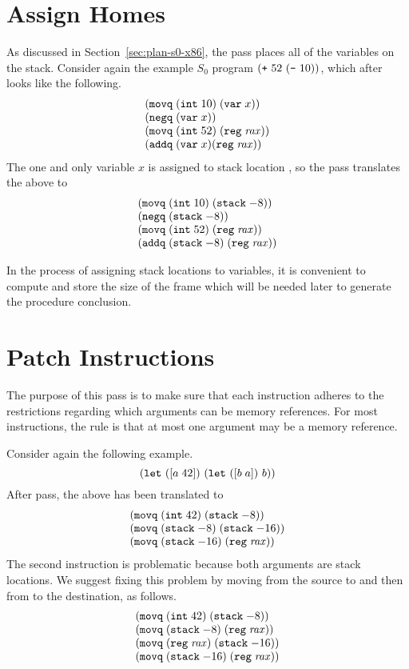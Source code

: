 \documentclass[12pt]{book}
\begin{document}
\section{Assign Homes}
\label{sec:assign-s0}

As discussed in Section~\ref{sec:plan-s0-x86}, the
 pass places all of the variables on the stack.
Consider again the example $S_0$ program $(\texttt{+}~52~ (\texttt{-}~10) )$,
which after  looks like the following.
\[
\begin{array}{l}
(\texttt{movq}\;(\texttt{int}\;10)\; (\texttt{var}\;x))\\
(\texttt{negq}\; (\texttt{var}\;x))\\
(\texttt{movq}\; (\texttt{int}\;52)\; (\texttt{reg}\;\mathit{rax}))\\
(\texttt{addq}\; (\texttt{var}\;x) (\texttt{reg}\;\mathit{rax}))
\end{array}
\]
The one and only variable $x$ is assigned to stack location
, so the  pass translates the
above to
\[
\begin{array}{l}
(\texttt{movq}\;(\texttt{int}\;10)\; (\texttt{stack}\;{-}8))\\
(\texttt{negq}\; (\texttt{stack}\;{-}8))\\
(\texttt{movq}\; (\texttt{int}\;52)\; (\texttt{reg}\;\mathit{rax}))\\
(\texttt{addq}\; (\texttt{stack}\;{-}8)\; (\texttt{reg}\;\mathit{rax}))
\end{array}
\]

In the process of assigning stack locations to variables, it is
convenient to compute and store the size of the frame which will be
needed later to generate the procedure conclusion.

\section{Patch Instructions}
\label{sec:patch-s0}

The purpose of this pass is to make sure that each instruction adheres
to the restrictions regarding which arguments can be memory
references. For most instructions, the rule is that at most one
argument may be a memory reference.

Consider again the following example.
\[
(\texttt{let}~([a\;42])~ (\texttt{let}~([b\;a])~ b ))
\]
After  pass, the above has been translated to
\[
\begin{array}{l}
(\texttt{movq} \;(\texttt{int}\;42)\; (\texttt{stack}\;{-}8))\\
(\texttt{movq}\;(\texttt{stack}\;{-}8)\; (\texttt{stack}\;{-}16))\\
(\texttt{movq}\;(\texttt{stack}\;{-}16)\; (\texttt{reg}\;\mathit{rax}))
\end{array}
\]
The second  instruction is problematic because both arguments
are stack locations. We suggest fixing this problem by moving from the
source to  and then from  to the destination, as
follows.
\[
\begin{array}{l}
(\texttt{movq} \;(\texttt{int}\;42)\; (\texttt{stack}\;{-}8))\\
(\texttt{movq}\;(\texttt{stack}\;{-}8)\; (\texttt{reg}\;\mathit{rax}))\\
(\texttt{movq}\;(\texttt{reg}\;\mathit{rax})\; (\texttt{stack}\;{-}16))\\
(\texttt{movq}\;(\texttt{stack}\;{-}16)\; (\texttt{reg}\;\mathit{rax}))
\end{array}
\]
\end{document}

